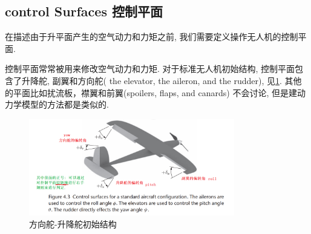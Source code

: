 \documentclass[UTF8,a4paper,10pt,nocolorlinks]{ctexart}
\begin{document}
    \subsection{control Surfaces 控制平面}
    在描述由于升平面产生的空气动力和力矩之前, 我们需要定义操作无人机的控制平面. \par
    控制平面常常被用来修改空气动力和力矩. 对于标准无人机初始结构, 控制平面包含了升降舵, 副翼和方向舵(
    the elevator, the aileron, and the rudder), 见\ref{fig:confi}. 其他的平面比如扰流板，襟翼和前翼(spoilers, flaps, and
    canards) 不会讨论, 但是建动力学模型的方法都是类似的.

    \begin{figure}
      \centering
      \includegraphics[width=0.8\textwidth]{picture/standard_confi.png}
      \caption{方向舵-升降舵初始结构}
      \label{fig:confi} %
    \end{figure}
\end{document}
